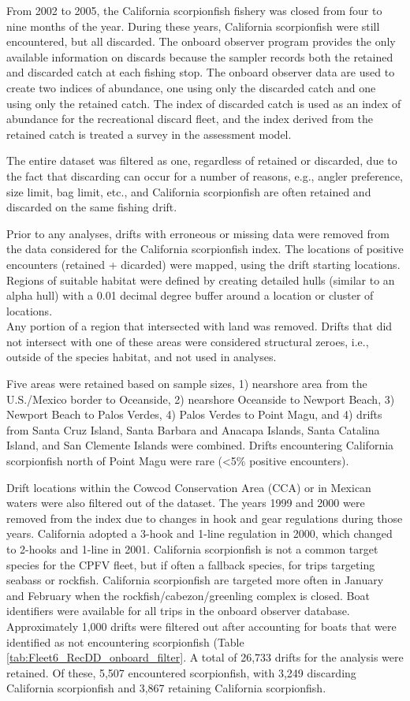 \documentclass[12pt,]{article}
\begin{document}
From 2002 to 2005, the California scorpionfish fishery was closed from
four to nine months of the year. During these years, California
scorpionfish were still encountered, but all discarded. The onboard
observer program provides the only available information on discards
because the sampler records both the retained and discarded catch at
each fishing stop. The onboard observer data are used to create two
indices of abundance, one using only the discarded catch and one using
only the retained catch. The index of discarded catch is used as an
index of abundance for the recreational discard fleet, and the index
derived from the retained catch is treated a survey in the assessment
model.

The entire dataset was filtered as one, regardless of retained or
discarded, due to the fact that discarding can occur for a number of
reasons, e.g., angler preference, size limit, bag limit, etc., and
California scorpionfish are often retained and discarded on the same
fishing drift.

Prior to any analyses, drifts with erroneous or missing data were
removed from the data considered for the California scorpionfish index.
The locations of positive encounters (retained + dicarded) were mapped,
using the drift starting locations. Regions of suitable habitat were
defined by creating detailed hulls (similar to an alpha hull) with a
0.01 decimal degree buffer around a location or cluster of locations.\\
Any portion of a region that intersected with land was removed. Drifts
that did not intersect with one of these areas were considered
structural zeroes, i.e., outside of the species habitat, and not used in
analyses.

Five areas were retained based on sample sizes, 1) nearshore area from
the U.S./Mexico border to Oceanside, 2) nearshore Oceanside to Newport
Beach, 3) Newport Beach to Palos Verdes, 4) Palos Verdes to Point Magu,
and 4) drifts from Santa Cruz Island, Santa Barbara and Anacapa Islands,
Santa Catalina Island, and San Clemente Islands were combined. Drifts
encountering California scorpionfish north of Point Magu were rare
(\textless{}5\% positive encounters).

Drift locations within the Cowcod Conservation Area (CCA) or in Mexican
waters were also filtered out of the dataset. The years 1999 and 2000
were removed from the index due to changes in hook and gear regulations
during those years. California adopted a 3-hook and 1-line regulation in
2000, which changed to 2-hooks and 1-line in 2001. California
scorpionfish is not a common target species for the CPFV fleet, but if
often a fallback species, for trips targeting seabass or rockfish.
California scorpionfish are targeted more often in January and February
when the rockfish/cabezon/greenling complex is closed. Boat identifiers
were available for all trips in the onboard observer database.
Approximately 1,000 drifts were filtered out after accounting for boats
that were identified as not encountering scorpionfish (Table
\ref{tab:Fleet6_RecDD_onboard_filter}. A total of 26,733 drifts for the
analysis were retained. Of these, 5,507 encountered scorpionfish, with
3,249 discarding California scorpionfish and 3,867 retaining California
scorpionfish.
\end{document}
